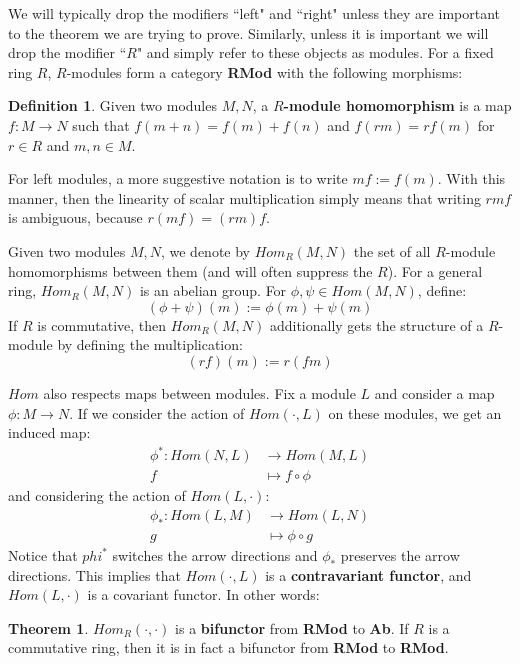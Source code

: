 \documentclass[11pt, oneside]{amsart}   	%
\theoremstyle{definition}
\newtheorem{definition}{Definition}[section]
\newtheorem{theorem}{Theorem}[section]
\begin{document}
We will typically drop the modifiers ``left" and ``right" unless they are important to the theorem we are trying to prove. Similarly, 
unless it is important we will drop the modifier ``$R$" and simply refer to these objects as modules. For a fixed ring $R$, 
$R$-modules form a category \textbf{RMod} with the following morphisms:
\begin{definition}
	Given two modules $M, N$, a \textbf{$R$-module homomorphism} is a map $f : M\rightarrow N$ such that $f(m + n) = 
	f(m) + f(n)$ and $f(rm) = rf(m)$ for $r\in R$ and $m, n\in M$. 
\end{definition}
For left modules, a more suggestive notation is to write $mf := f(m)$. With this manner, then the linearity of scalar multiplication 
simply means that writing $rmf$ is ambiguous, because $r(mf) = (rm)f$. 

Given two modules $M, N$, we denote by $Hom_R(M, N)$ the set of all $R$-module homomorphisms between them (and will 
often suppress the $R$). For a general ring, $Hom_R(M, N)$ is an abelian group. For $\phi, \psi\in Hom(M, N)$, define:
\begin{equation}
	(\phi + \psi)(m) := \phi(m) + \psi(m)
\end{equation}
If $R$ is commutative, then $Hom_R(M, N)$ additionally gets the structure of a $R$-module by defining the multiplication:
\begin{equation}
	(rf)(m) := r(fm)
\end{equation}

$Hom$ also respects maps between modules. Fix a module $L$ and consider a map $\phi : M\rightarrow N$. If we consider the 
action of $Hom(\cdot, L)$ on these modules, we get an induced map:
\begin{align}
	\phi^* : Hom(N, L) &\rightarrow Hom(M, L) \\
	f & \mapsto f\circ\phi
\end{align}
and considering the action of $Hom(L, \cdot)$:
\begin{align}
	\phi_* : Hom(L, M) &\rightarrow Hom(L, N) \\
	g &\mapsto \phi\circ g
\end{align}
Notice that $phi^*$ switches the arrow directions and $\phi_*$ preserves the arrow directions. This implies that $Hom(\cdot, L)$ is a 
\textbf{contravariant functor}, and $Hom(L, \cdot)$ is a covariant functor. In other words:
\begin{theorem}
	$Hom_R(\cdot, \cdot)$ is a \textbf{bifunctor} from \textbf{RMod} to \textbf{Ab}. If $R$ is a commutative ring, then it is in fact a 
	bifunctor from \textbf{RMod} to \textbf{RMod}. 
\end{theorem}
\end{document}
